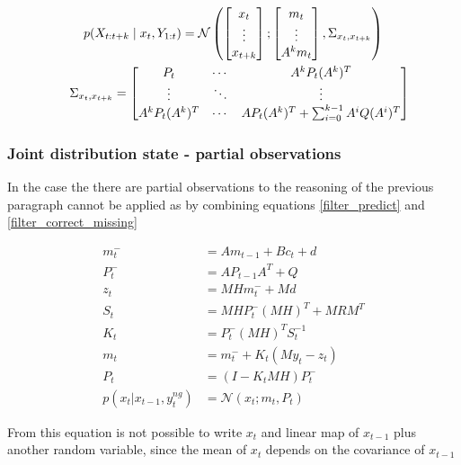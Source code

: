 \documentclass{article}
\newcommand{\norm}[3]{\mathcal{N}\left(#1; #2, #3\right)}
\begin{document}
\begin{multline}\label{p_X_final}
p(X_{t:t+k}\mid x_t, Y_{1:t}) =\norm{\begin{bmatrix}x_t\\\vdots\\x_{t+k}\end{bmatrix}}{\begin{bmatrix}m_t\\\vdots\\A^km_t\end{bmatrix}}{\Sigma_{x_t, x_{t+k}}}\\
\shoveleft\Sigma_{x_t, x_{t+k}} = {\begin{bmatrix}P_t & \cdots & A^kP_t(A^k)^T\\ \vdots & \ddots & \vdots \\A^kP_t(A^k)^T & \cdots & AP_t(A^k)^T + \sum_{i=0}^{k-1} A^iQ(A^i)^T\end{bmatrix}}
\end{multline}



\subsubsection{Joint distribution state - partial observations}

In the case the there are partial observations to the reasoning of the previous paragraph cannot be applied as by combining equations \ref{filter_predict} and \ref{filter_correct_missing}

\begin{equation}\label{filter_combined}
\begin{split}
    m_t^- &= Am_{t-1} + B c_t + d\\
    P_t^- &= AP_{t-1}A^T + Q\\
    z_t &= MHm_t^- + Md\\
    S_t &= MHP_t^-(MH)^T + MRM^T\\
    K_t &= P_t^-(MH)^TS_t^{-1}\\
    m_t &= m_t^- + K_t(My_t - z_t)\\
    P_t &= (I-K_tMH)P_t^-\\
    p(x_t|x_{t-1}, y^{ng}_t) &= \mathcal{N}(x_t; m_t, P_t)
\end{split}
\end{equation}

From this equation is not possible to write $x_t$ and linear map of $x_{t-1}$ plus another random variable, since the mean of $x_t$ depends on the covariance of $x_{t-1}$ 
    
\end{document}

